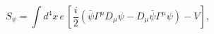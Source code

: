 \begin{equation}\label{eq:Lagrangian}
  S_\psi=\int d^4x \,e \,
  \left[\frac{i}{2}\left(\bar{\psi}\Gamma^\mu D_\mu\psi
    -D_\mu \bar{\psi}\Gamma^\mu \psi\right)-V\right],
\end{equation}

